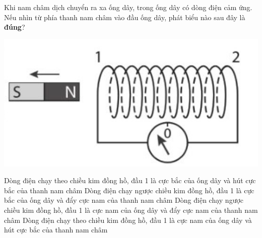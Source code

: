 \begin{ex}
	Khi nam châm dịch chuyển ra xa ống dây, trong ống dây có dòng điện cảm ứng. Nếu nhìn từ phía thanh nam châm vào đầu ống dây, phát biểu nào sau đây là \textbf{đúng}?
	\begin{center}
		\includegraphics[width=0.4\linewidth]{figs/VN12-Y24-PH-SYL-020P-18}
	\end{center}
	\choice
	{Dòng điện chạy theo chiều kim đồng hồ, đầu 1 là cực bắc của ống dây và hút cực bắc của thanh nam châm}
	{Dòng điện chạy ngược chiều kim đồng hồ, đầu 1 là cực bắc của ống dây và đẩy cực nam của thanh nam châm}
	{Dòng điện chạy ngược chiều kim đồng hồ, đầu 1 là cực nam của ống dây và đẩy cực nam của thanh nam châm}
	{\True Dòng điện chạy theo chiều kim đồng hồ, đầu 1 là cực nam của ống dây và hút cực bắc của thanh nam châm}
	\loigiai{}
\end{ex}

